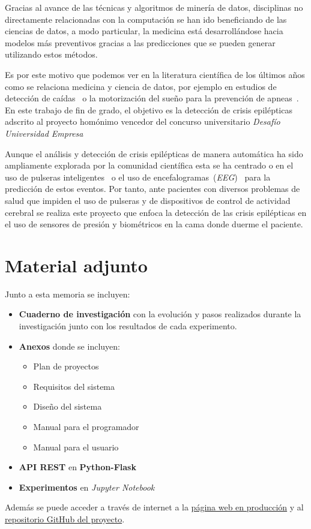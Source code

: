 
Gracias al avance de las técnicas y algoritmos de minería de datos, disciplinas no directamente relacionadas con la computación se han ido beneficiando de las ciencias de datos, a modo particular, la medicina está desarrollándose hacia modelos más preventivos gracias a las predicciones que se pueden generar utilizando estos métodos.

Es por este motivo que podemos ver en la literatura científica de los últimos años como se relaciona medicina y ciencia de datos, por ejemplo en estudios de detección de caídas~\cite{tolkiehn2011fall} o la motorización del sueño para la prevención de apneas~\cite{kortelainen2012sleepmonitoring}. En este trabajo de fin de grado, el objetivo es la detección de crisis epilépticas adscrito al proyecto homónimo vencedor del concurso universitario \textit{Desafío Universidad Empresa}~\cite{radio:radio_amiga_burgos_2018}

Aunque el análisis y detección de crisis epilépticas de manera automática ha sido ampliamente explorada por la comunidad científica esta se ha centrado o en el uso de pulseras inteligentes~\cite{ramgopal2014product_review} o el uso de encefalogramas~(\textit{EEG})~\cite{jeppesen2017modified,kumar2014epilepticeeg,tzallas2012review} para la predicción de estos eventos. Por tanto, ante pacientes con diversos problemas de salud que impiden el uso de pulseras y de dispositivos de control de actividad cerebral se realiza este proyecto que enfoca la detección de las crisis epilépticas en el uso de sensores de presión y biométricos en la cama donde duerme el paciente.

\section{Material adjunto}
Junto a esta memoria se incluyen:

\begin{itemize}
	\item \textbf{Cuaderno de investigación} con la evolución y pasos realizados durante la investigación junto con los resultados de cada experimento.
	\item \textbf{Anexos} donde se incluyen:
		\begin{itemize}
			\item Plan de proyectos
			\item Requisitos del sistema
			\item Diseño del sistema
			\item Manual para el programador
			\item Manual para el usuario
		\end{itemize}
	\item \textbf{API REST} en \textbf{Python-Flask}
	\item \textbf{Experimentos} en \textit{Jupyter Notebook}
\end{itemize}

Además se puede acceder a través de internet a la \href{https://ubu.joselucross.com}{ página web en producción} y al \href{https://github.com/jlgarridol/TFG-Smartbeds}{repositorio GitHub del proyecto}.